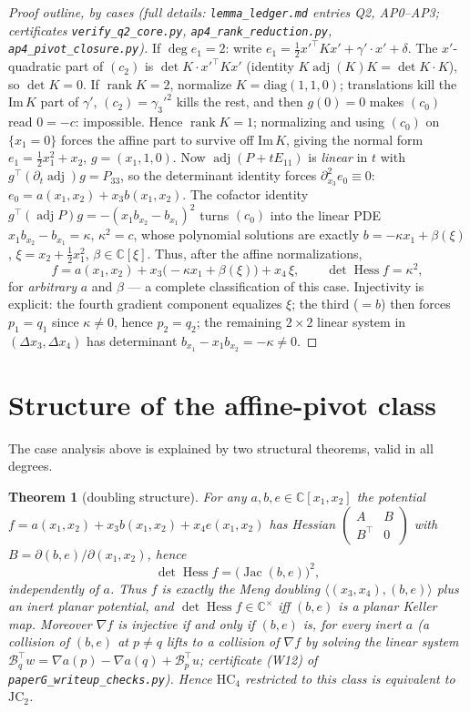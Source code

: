 \documentclass[11pt]{article}
\theoremstyle{plain}
\newtheorem{theorem}{Theorem}[section]
\theoremstyle{definition}
\newcommand{\C}{\mathbb{C}}
\newcommand{\Hess}{\operatorname{Hess}}
\newcommand{\adj}{\operatorname{adj}}
\newcommand{\HC}{\mathrm{HC}}
\newcommand{\JC}{\mathrm{JC}}
\newcommand{\Jac}{\operatorname{Jac}}
\begin{document}
\begin{proof}[Proof outline, by cases (full details:
\texttt{lemma\_ledger.md} entries Q2, AP0--AP3; certificates
\texttt{verify\_q2\_core.py}, \texttt{ap4\_rank\_reduction.py},
\texttt{ap4\_pivot\_closure.py})]
If $\deg e_1=2$: write $e_1=\tfrac12x'^\top Kx'+\gamma'\!\cdot x'+\delta$.
The $x'$-quadratic part of $(c_2)$ is $\det K\cdot x'^\top Kx'$ (identity
$K\adj(K)K=\det K\cdot K$), so $\det K=0$. If $\operatorname{rank}K=2$,
normalize $K=\mathrm{diag}(1,1,0)$; translations kill the $\mathrm{Im}\,K$
part of $\gamma'$, $(c_2)=\gamma_3'^2$ kills the rest, and then $g(0)=0$
makes $(c_0)$ read $0=-c$: impossible. Hence $\operatorname{rank}K=1$;
normalizing and using $(c_0)$ on $\{x_1=0\}$ forces the affine part to
survive off $\mathrm{Im}\,K$, giving the normal form
$e_1=\tfrac12x_1^2+x_2$, $g=(x_1,1,0)$.
Now $\adj(P+tE_{11})$ is \emph{linear} in $t$ with
$g^\top(\partial_t\adj)g=P_{33}$, so the determinant identity forces
$\partial_{x_3}^2e_0\equiv0$: $e_0=a(x_1,x_2)+x_3b(x_1,x_2)$. The cofactor
identity $g^\top(\adj P)g=-(x_1b_{x_2}-b_{x_1})^2$ turns $(c_0)$ into the
linear PDE $x_1b_{x_2}-b_{x_1}=\kappa$, $\kappa^2=c$, whose polynomial
solutions are exactly $b=-\kappa x_1+\beta(\xi)$, $\xi=x_2+\tfrac12x_1^2$,
$\beta\in\C[\xi]$. Thus, after the affine normalizations,
\[
f=a(x_1,x_2)+x_3\bigl(-\kappa x_1+\beta(\xi)\bigr)+x_4\,\xi ,
\qquad \det\Hess f=\kappa^2 ,
\]
for \emph{arbitrary} $a$ and $\beta$ --- a complete classification of this
case. Injectivity is explicit: the fourth gradient component equalizes
$\xi$; the third ($=b$) then forces $p_1=q_1$ since $\kappa\ne0$, hence
$p_2=q_2$; the remaining $2\times2$ linear system in $(\Delta x_3,\Delta
x_4)$ has determinant $b_{x_1}-x_1b_{x_2}=-\kappa\ne0$.
\end{proof}

\section{Structure of the affine-pivot class}

The case analysis above is explained by two structural theorems, valid in
all degrees.

\begin{theorem}[doubling structure]\label{thm:doubling}
For any $a,b,e\in\C[x_1,x_2]$ the potential
$f=a(x_1,x_2)+x_3b(x_1,x_2)+x_4e(x_1,x_2)$ has Hessian
$\left(\begin{smallmatrix}A&B\\B^\top&0\end{smallmatrix}\right)$ with
$B=\partial(b,e)/\partial(x_1,x_2)$, hence
\[
\det\Hess f=\bigl(\Jac(b,e)\bigr)^2 ,
\]
\emph{independently of $a$}. Thus $f$ is exactly the Meng doubling
$\langle(x_3,x_4),(b,e)\rangle$ plus an inert planar potential, and
$\det\Hess f\in\C^\times$ iff $(b,e)$ is a planar Keller map. Moreover
$\nabla f$ is injective if and only if $(b,e)$ is, for \emph{every} inert
$a$ (a collision of $(b,e)$ at $p\ne q$ lifts to a collision of $\nabla f$
by solving the linear system $\mathcal B_q^{\top}w=\nabla a(p)-\nabla a(q)
+\mathcal B_p^{\top}u$; certificate (W12) of
\texttt{paperG\_writeup\_checks.py}). Hence
$\HC_4$ restricted to this class is \emph{equivalent} to $\JC_2$.
\end{theorem}
\end{document}
